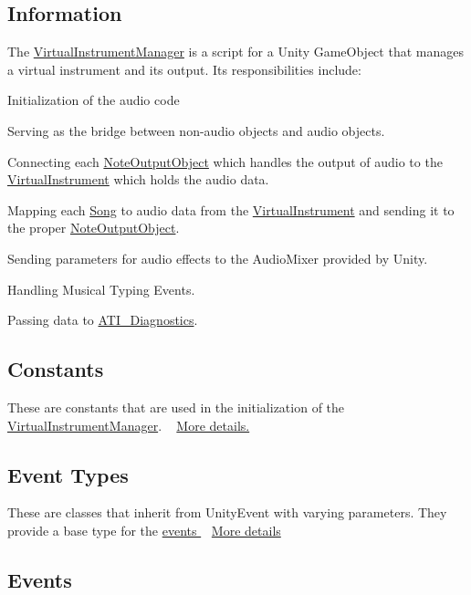 \hypertarget{group___v_i_m_VIMInfo}{}\subsection{Information}\label{group___v_i_m_VIMInfo}
The \hyperlink{class_virtual_instrument_manager}{Virtual\+Instrument\+Manager} is a script for a Unity Game\+Object that manages a virtual instrument and its output. Its responsibilities include\+: \begin{DoxyItemize}
\item Initialization of the audio code \item Serving as the bridge between non-\/audio objects and audio objects. \item Connecting each \hyperlink{class_note_output_object}{Note\+Output\+Object} which handles the output of audio to the \hyperlink{class_virtual_instrument}{Virtual\+Instrument} which holds the audio data. \item Mapping each \hyperlink{class_song}{Song} to audio data from the \hyperlink{class_virtual_instrument}{Virtual\+Instrument} and sending it to the proper \hyperlink{class_note_output_object}{Note\+Output\+Object}. \item Sending parameters for audio effects to the Audio\+Mixer provided by Unity. \item Handling Musical Typing Events. \item Passing data to \hyperlink{group___audio_testing_class_a_t_i___diagnostics}{A\+T\+I\+\_\+\+Diagnostics}.\end{DoxyItemize}
\hypertarget{group___v_i_m_DocVIMConst}{}\subsection{Constants}\label{group___v_i_m_DocVIMConst}
These are constants that are used in the initialization of the \hyperlink{class_virtual_instrument_manager}{Virtual\+Instrument\+Manager}. ~\newline
 \hyperlink{group___v_i_m_const}{More details.}\hypertarget{group___v_i_m_DocVIMEventTypes}{}\subsection{Event Types}\label{group___v_i_m_DocVIMEventTypes}
These are classes that inherit from Unity\+Event with varying parameters. They provide a base type for the \hyperlink{group___v_i_m_events}{events } ~\newline
 \hyperlink{group___v_i_m_event_types}{More details }\hypertarget{group___v_i_m_DocVIMEvents}{}\subsection{Events}\label{group___v_i_m_DocVIMEvents}
